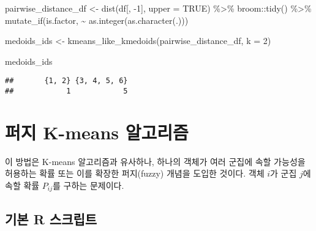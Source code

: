 \documentclass[
]{book}
\newenvironment{Shaded}{\begin{snugshade}}{\end{snugshade}}
\newcommand{\AttributeTok}[1]{\textcolor[rgb]{0.77,0.63,0.00}{#1}}
\newcommand{\ConstantTok}[1]{\textcolor[rgb]{0.00,0.00,0.00}{#1}}
\newcommand{\DecValTok}[1]{\textcolor[rgb]{0.00,0.00,0.81}{#1}}
\newcommand{\FunctionTok}[1]{\textcolor[rgb]{0.00,0.00,0.00}{#1}}
\newcommand{\NormalTok}[1]{#1}
\newcommand{\OtherTok}[1]{\textcolor[rgb]{0.56,0.35,0.01}{#1}}
\newcommand{\SpecialCharTok}[1]{\textcolor[rgb]{0.00,0.00,0.00}{#1}}
\begin{document}
\begin{Shaded}
\begin{Highlighting}[]
\NormalTok{pairwise\_distance\_df }\OtherTok{\textless{}{-}} \FunctionTok{dist}\NormalTok{(df[, }\SpecialCharTok{{-}}\DecValTok{1}\NormalTok{], }\AttributeTok{upper =} \ConstantTok{TRUE}\NormalTok{) }\SpecialCharTok{\%\textgreater{}\%}
\NormalTok{  broom}\SpecialCharTok{::}\FunctionTok{tidy}\NormalTok{() }\SpecialCharTok{\%\textgreater{}\%}
  \FunctionTok{mutate\_if}\NormalTok{(is.factor, }\SpecialCharTok{\textasciitilde{}} \FunctionTok{as.integer}\NormalTok{(}\FunctionTok{as.character}\NormalTok{(.)))}

\NormalTok{medoids\_ids }\OtherTok{\textless{}{-}} \FunctionTok{kmeans\_like\_kmedoids}\NormalTok{(pairwise\_distance\_df, }\AttributeTok{k =} \DecValTok{2}\NormalTok{)}

\NormalTok{medoids\_ids}
\end{Highlighting}
\end{Shaded}

\begin{verbatim}
##       {1, 2} {3, 4, 5, 6} 
##            1            5
\end{verbatim}

\hypertarget{fuzzy-kmeans}{%
\section{퍼지 K-means 알고리즘}\label{fuzzy-kmeans}}

이 방법은 K-means 알고리즘과 유사하나, 하나의 객체가 여러 군집에 속할 가능성을 허용하는 확률 또는 이를 확장한 퍼지(fuzzy) 개념을 도입한 것이다. 객체 \(i\)가 군집 \(j\)에 속할 확률 \(P_{ij}\)를 구하는 문제이다.

\hypertarget{fuzzy-kmeans-basic-script}{%
\subsection{기본 R 스크립트}\label{fuzzy-kmeans-basic-script}}
\end{document}
